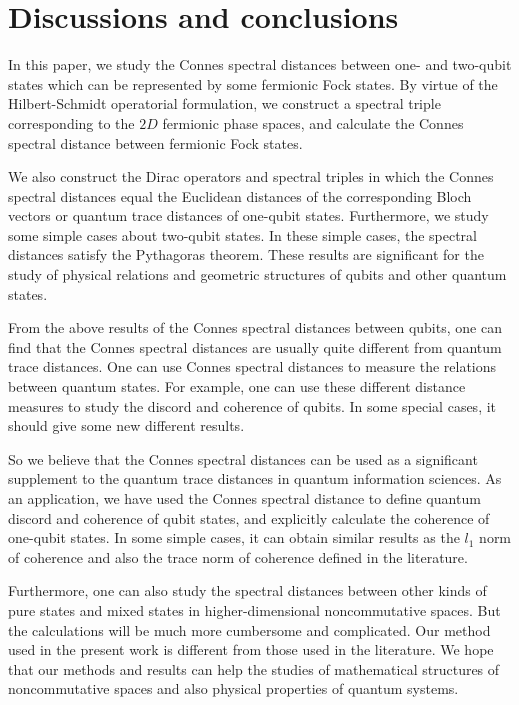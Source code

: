 \documentclass[a4paper,12pt]{article}
\begin{document}
\section{Discussions and conclusions}\label{sec7}
In this paper, we study the Connes spectral distances between one- and two-qubit states which can be represented by some fermionic Fock states.
By virtue of the Hilbert-Schmidt operatorial formulation, we construct a spectral triple corresponding to the $2D$ fermionic phase spaces, and calculate the Connes spectral distance between fermionic Fock states.


We also construct the Dirac operators and spectral triples in which the Connes spectral distances equal the Euclidean distances of the corresponding Bloch vectors or quantum trace distances of one-qubit states.
Furthermore, we study some simple cases about two-qubit states. In these simple cases, the spectral distances satisfy the Pythagoras theorem. These results are significant for the study of physical relations and geometric structures of qubits and other quantum states.

From the above results of the Connes spectral distances between qubits, one can find that the Connes spectral distances are usually quite different from quantum trace distances. One can use Connes spectral distances to measure the relations between quantum states. For example, one can use these different distance measures to study the discord and coherence of qubits. In some special cases, it should give some new different results.

So we believe that the Connes spectral distances can be used as a significant supplement to the quantum trace distances in quantum information sciences.
As an application, 
we have used the Connes spectral distance to define quantum discord and coherence of qubit states, and explicitly calculate the coherence of one-qubit states.
In some simple cases, it can obtain similar results as the $l_1$ norm of coherence and also the trace norm of coherence defined in the literature.


Furthermore, one can also study the spectral distances between other kinds of pure states and mixed states in higher-dimensional noncommutative spaces.
But the calculations will be much more cumbersome and complicated.
Our method used in the present work is different from those used in the literature.
We hope that our methods and results can help the studies of mathematical structures of noncommutative spaces and also physical properties of quantum systems.
\end{document}
